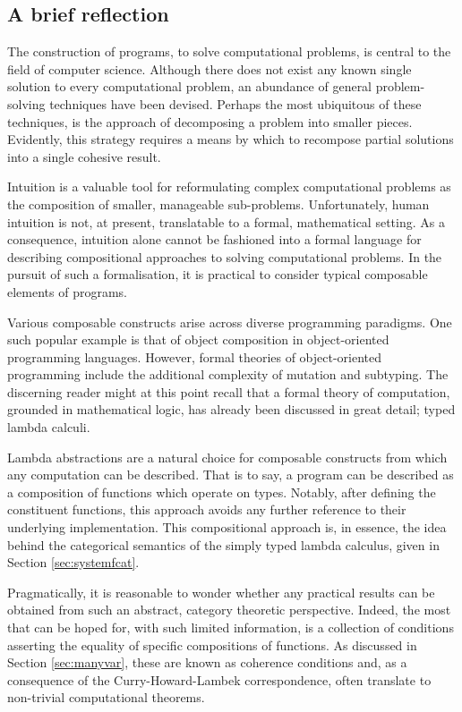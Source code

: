 \documentclass[../../Reflection.tex]{subfiles}
\begin{document}
\subsection{A brief reflection}
The construction of programs, to solve computational problems, is central to the field of computer science. Although there does not exist any known single solution to every computational problem, an abundance of general problem-solving techniques have been devised. Perhaps the most ubiquitous of these techniques, is the approach of decomposing a problem into smaller pieces. Evidently, this strategy requires a means by which to recompose partial solutions into a single cohesive result.
\par
Intuition is a valuable tool for reformulating complex computational problems as the composition of smaller, manageable sub-problems. Unfortunately, human intuition is not, at present, translatable to a formal, mathematical setting. As a consequence, intuition alone cannot be fashioned into a formal language for describing compositional approaches to solving computational problems. In the pursuit of such a formalisation, it is practical to consider typical composable elements of programs.
\par
Various composable constructs arise across diverse programming paradigms. One such popular example is that of object composition in object-oriented programming languages. However, formal theories of object-oriented programming include the additional complexity of mutation and subtyping. The discerning reader might at this point recall that a formal theory of computation, grounded in mathematical logic, has already been discussed in great detail; typed lambda calculi.
\par
Lambda abstractions are a natural choice for composable constructs from which any computation can be described. That is to say, a program can be described as a composition of functions which operate on types. Notably, after defining the constituent functions, this approach avoids any further reference to their underlying implementation. This compositional approach is, in essence, the idea behind the categorical semantics of the simply typed lambda calculus, given in  Section \ref{sec:systemfcat}.
\par
Pragmatically, it is reasonable to wonder whether any practical results can be obtained from such an abstract, category theoretic perspective. Indeed, the most that can be hoped for, with such limited information, is a collection of conditions asserting the equality of specific compositions of functions. As discussed in Section \ref{sec:manyvar}, these are known as coherence conditions and, as a consequence of the Curry-Howard-Lambek correspondence, often translate to non-trivial computational theorems. 
\end{document}
